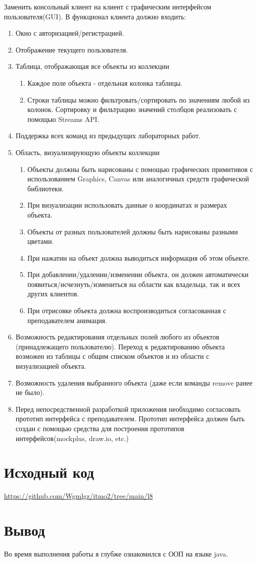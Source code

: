 \documentclass{article}
\begin{document}
Заменить консольный клиент на клиент с графическим интерфейсом пользователя(GUI). 
В функционал клиента должно входить:
\begin{enumerate}

  \item Окно с авторизацией/регистрацией.
  \item Отображение текущего пользователя.
  \item Таблица, отображающая все объекты из коллекции \begin{enumerate}
          \item Каждое поле объекта - отдельная колонка таблицы.
          \item Строки таблицы можно фильтровать/сортировать по значениям любой из колонок. Сортировку и фильтрацию значений столбцов реализовать с помощью Streams API.
        \end{enumerate}
  \item Поддержка всех команд из предыдущих лабораторных работ.
  \item Область, визуализирующую объекты коллекции \begin{enumerate}
          \item Объекты должны быть нарисованы с помощью графических примитивов с использованием Graphics, Canvas или аналогичных средств графической библиотеки.
          \item При визуализации использовать данные о координатах и размерах объекта.
          \item Объекты от разных пользователей должны быть нарисованы разными цветами.
          \item При нажатии на объект должна выводиться информация об этом объекте.
          \item При добавлении/удалении/изменении объекта, он должен автоматически появиться/исчезнуть/измениться  на области как владельца, так и всех других клиентов.
          \item При отрисовке объекта должна воспроизводиться согласованная с преподавателем анимация.
        \end{enumerate}
  \item Возможность редактирования отдельных полей любого из объектов (принадлежащего пользователю). Переход к редактированию объекта возможен из таблицы с общим списком объектов и из области с визуализацией объекта.
  \item Возможность удаления выбранного объекта (даже если команды remove ранее не было).
  \item Перед непосредственной разработкой приложения необходимо согласовать прототип интерфейса с преподавателем. Прототип интерфейса должен быть создан с помощью средства для построения прототипов интерфейсов(mockplus, draw.io, etc.)
\end{enumerate}

\section*{Исходный код}
\url{https://github.com/Wgmlgz/itmo2/tree/main/l8}

\section*{Вывод}
Во время выполнения работы я глубже ознакомился с ООП на языке java.
\end{document}
